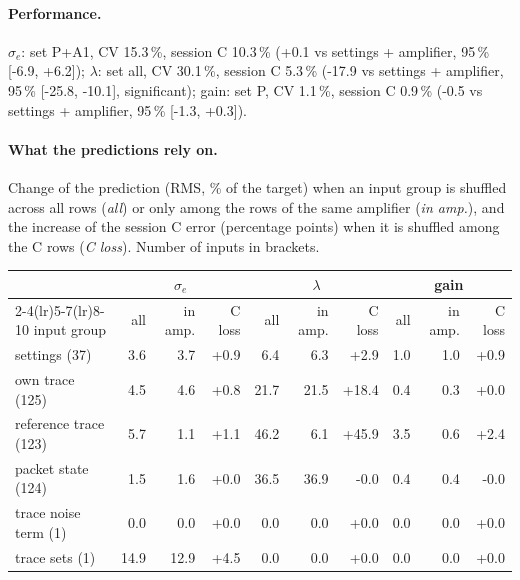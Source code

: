 \paragraph{Performance.}
$\sigma_e$: set P+A1, CV 15.3\,\%, session C 10.3\,\% (+0.1 vs settings + amplifier, 95\,\% [-6.9, +6.2]); $\lambda$: set all, CV 30.1\,\%, session C 5.3\,\% (-17.9 vs settings + amplifier, 95\,\% [-25.8, -10.1], significant); gain: set P, CV 1.1\,\%, session C 0.9\,\% (-0.5 vs settings + amplifier, 95\,\% [-1.3, +0.3]).
\paragraph{What the predictions rely on.} Change of the prediction (RMS, \% of the target) when an input group is shuffled across all rows (\emph{all}) or only among the rows of the same amplifier (\emph{in amp.}), and the increase of the session C error (percentage points) when it is shuffled among the C rows (\emph{C loss}). Number of inputs in brackets.
\begin{center}\footnotesize
\begin{tabular}{lrrrrrrrrr}
\toprule
 & \multicolumn{3}{c}{$\sigma_e$} & \multicolumn{3}{c}{$\lambda$} & \multicolumn{3}{c}{gain} \\
\cmidrule(lr){2-4}\cmidrule(lr){5-7}\cmidrule(lr){8-10}
input group & all & in amp. & C loss & all & in amp. & C loss & all & in amp. & C loss \\
\midrule
settings (37) & 3.6 & 3.7 & +0.9 & 6.4 & 6.3 & +2.9 & 1.0 & 1.0 & +0.9 \\
own trace (125) & 4.5 & 4.6 & +0.8 & 21.7 & 21.5 & +18.4 & 0.4 & 0.3 & +0.0 \\
reference trace (123) & 5.7 & 1.1 & +1.1 & 46.2 & 6.1 & +45.9 & 3.5 & 0.6 & +2.4 \\
packet state (124) & 1.5 & 1.6 & +0.0 & 36.5 & 36.9 & -0.0 & 0.4 & 0.4 & -0.0 \\
trace noise term (1) & 0.0 & 0.0 & +0.0 & 0.0 & 0.0 & +0.0 & 0.0 & 0.0 & +0.0 \\
trace sets (1) & 14.9 & 12.9 & +4.5 & 0.0 & 0.0 & +0.0 & 0.0 & 0.0 & +0.0 \\
\bottomrule
\end{tabular}
\end{center}
